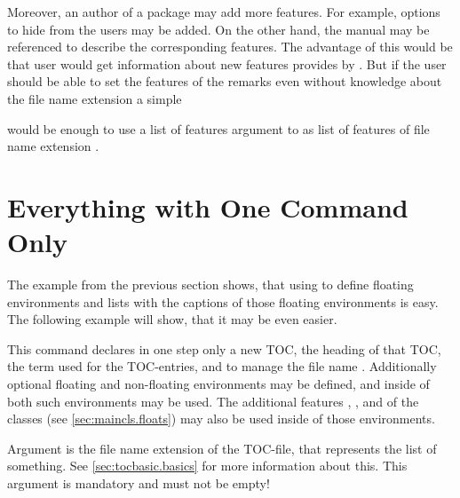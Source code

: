 Moreover, an author of a package may add more
features. For example, options to hide  from the users may be
added. On the other hand, the  manual may be referenced to
describe the corresponding features. The advantage of this would be that user
would get information about new features provides by . But
if the user should be able to set the features of the remarks even without
knowledge about the file name extension  a simple
\begin{lstcode}[belowskip=\dp\strutbox plus 1pt]
  \newcommand*{\setupremarkboxes}{\setuptoc{lor}}
\end{lstcode}
would be enough to use a list of features argument to
 as list of features of file name extension .

\section{Everything with One Command Only}
\label{sec:tocbasic.highlevel}

The example from the previous section shows, that using  to
define floating environments and lists with the captions of those floating
environments is easy. The following example will show, that it may be even
easier.

\begin{Declaration}
\end{Declaration}
%
This command declares in one step only a
new TOC, the heading of that TOC, the term used for the TOC-entries, and to
manage the file name . Additionally optional floating and
non-floating environments may be defined, and inside of both such environments
 may be used. The
additional features , , and 
of the \KOMAScript{} classes (see \autoref{sec:maincls.floats}) may also be
used inside of those environments.

Argument  is the file name extension of the TOC-file, that
represents the list of something. See \autoref{sec:tocbasic.basics} for more
information about this. This argument is mandatory and must not be empty!

